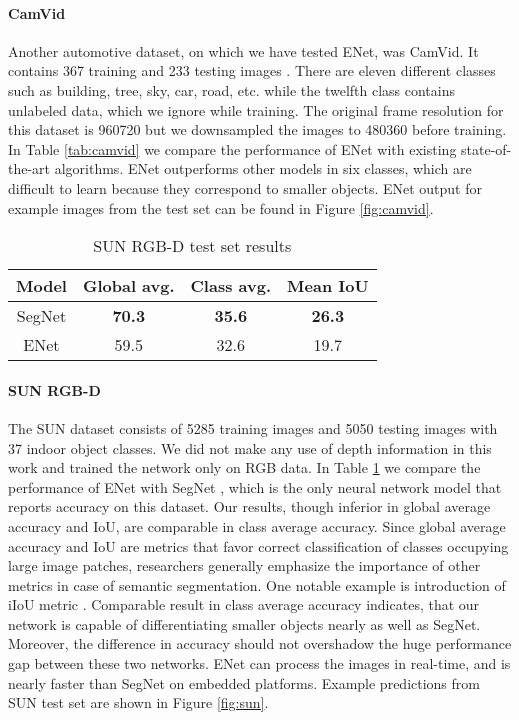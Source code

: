 \documentclass{article}
\begin{document}
\paragraph{CamVid}

Another automotive dataset, on which we have tested ENet, was CamVid.
It contains 367 training and 233 testing images \cite{camvid08}.
There are eleven different classes such as building, tree, sky, car, road, etc. while the twelfth class contains unlabeled data, which we ignore while training.
The original frame resolution for this dataset is 960720 but we downsampled the images to 480360 before training.
In Table \ref{tab:camvid} we compare the performance of ENet with existing state-of-the-art algorithms.
ENet outperforms other models in six classes, which are difficult to learn because they correspond to smaller objects.
ENet output for example images from the test set can be found in Figure \ref{fig:camvid}.

\begin{table}[htb]
  \small
  \caption{SUN RGB-D test set results}
  \vspace{0.05in}
  \label{tab:sun1}
  \centering
  \begin{tabular}{ c c c c }
    \toprule
    Model           &Global avg.      &Class avg.     &Mean IoU    \\
    \midrule
    SegNet          &\textbf{70.3}    &\textbf{35.6}  &\textbf{26.3}\\
    ENet            &59.5             &32.6           &19.7         \\
    \bottomrule
  \end{tabular}

\end{table}

\paragraph{SUN RGB-D}
The SUN dataset consists of 5285 training images and 5050 testing images with 37 indoor object classes.
We did not make any use of depth information in this work and trained the network only on RGB data.
In Table \ref{tab:sun1} we compare the performance of ENet with SegNet \cite{badrinarayanan15}, which is the only neural network model that reports accuracy on this dataset.
Our results, though inferior in global average accuracy and IoU, are comparable in class average accuracy.
Since global average accuracy and IoU are metrics that favor correct classification of classes occupying large image patches, researchers generally emphasize the importance of other metrics in case of semantic segmentation.
One notable example is introduction of iIoU metric \cite{cityscape2016}.
Comparable result in class average accuracy indicates, that our network is capable of differentiating smaller objects nearly as well as SegNet.
Moreover, the difference in accuracy should not overshadow the huge performance gap between these two networks.
ENet can process the images in real-time, and is nearly  faster than SegNet on embedded platforms.
Example predictions from SUN test set are shown in Figure \ref{fig:sun}.
\end{document}
